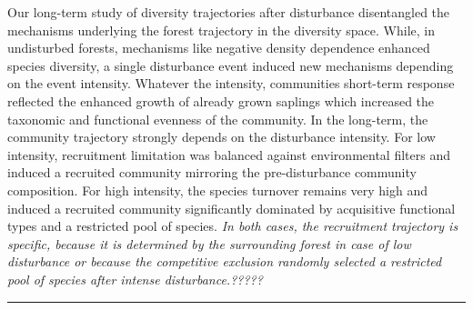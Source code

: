\documentclass[fleqn,10pt]{ArtEcoFoG} %
\begin{document}
Our long-term study of diversity trajectories after disturbance
disentangled the mechanisms underlying the forest trajectory in the
diversity space. While, in undisturbed forests, mechanisms like negative
density dependence enhanced species diversity, a single disturbance
event induced new mechanisms depending on the event intensity. Whatever
the intensity, communities short-term response reflected the enhanced
growth of already grown saplings which increased the taxonomic and
functional evenness of the community. In the long-term, the community
trajectory strongly depends on the disturbance intensity. For low
intensity, recruitment limitation was balanced against environmental
filters and induced a recruited community mirroring the pre-disturbance
community composition. For high intensity, the species turnover remains
very high and induced a recruited community significantly dominated by
acquisitive functional types and a restricted pool of species. \emph{In
both cases, the recruitment trajectory is specific, because it is
determined by the surrounding forest in case of low disturbance or
because the competitive exclusion randomly selected a restricted pool of
species after intense disturbance.?????}

\begin{center}\rule{0.5\linewidth}{\linethickness}\end{center}





\end{document}
